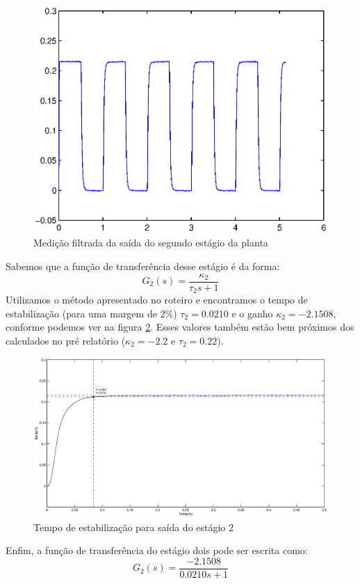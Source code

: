 \documentclass{article}
\begin{document}
\begin{figure}[H]
	\centering
	\includegraphics[width=\linewidth]{2filtrado}
	\caption{Medição filtrada da saída do segundo estágio da planta}
	\label{fig:2filtrado}
\end{figure}

Sabemos que a função de transferência desse estágio é da forma:
\begin{equation}
\label{eq:gs2}
G_2(s) = \frac{\kappa_2}{\tau_2 s + 1}
\end{equation}
Utilizamos o método apresentado no roteiro \cite{bb:roteiro} e encontramos o tempo de estabilização (para uma margem de $2\%$) $\tau_2 = 0.0210$ e o ganho $\kappa_2 = -2.1508$, conforme podemos ver na figura \ref{fig:2settling}. Esses valores também estão bem próximos dos calculados no pré relatório ($\kappa_2 = -2.2$ e $\tau_2 = 0.22$).
\begin{figure}[H]
	\centering
	\includegraphics[width=\linewidth]{2settling}
	\caption{Tempo de estabilização para saída do estágio 2}
	\label{fig:2settling}
\end{figure}
Enfim, a função de transferência do estágio dois pode ser escrita como:
\begin{equation}
\label{eq:g2}
G_2(s) = \frac{-2.1508}{0.0210 s + 1}
\end{equation}
\end{document}
